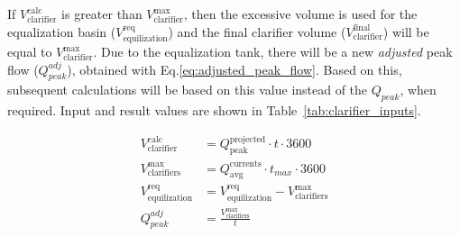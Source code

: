 \documentclass[11pt]{article}
\begin{document}
If $V_{\text{clarifier}}^{\text{calc}}$  is greater than $V_{\text{clarifier}}^{\text{max}}$, then the excessive volume 
is used for the equalization basin ($V_{\text{equilization}}^{\text{req}}$) and the final clarifier 
volume ($V_{\text{clarifier}}^{\text{final}}$) will be equal to 
$V_{\text{clarifier}}^{\text{max}}$. Due to the equalization tank, there will 
be a new \textit{adjusted} peak flow ($Q_{peak}^{adj}$), obtained with Eq.\eqref{eq:adjusted_peak_flow}. Based on this, subsequent calculations will 
be based on this value instead of the $Q_{peak}$, when required. Input and result values are
shown in Table~\ref{tab:clarifier_inputs}.


\begin{align}
V_{\text{clarifier}}^{\text{calc}} &= Q_{\text{peak}}^{\text{projected}} \cdot t \cdot 3600 \label{eq:clarifier_volume}\\
V_{\text{clarifiers}}^{\text{max}} &= Q_{\text{avg}}^{\text{currents}} \cdot t_{max} \cdot 3600 \label{eq:clarifier_max_volume}\\
V_{\text{equilization}}^{\text{req}} &=V_{\text{equilization}}^{\text{req}}-V_{\text{clarifiers}}^{\text{max}} \label{eq:required_equilization_volume}\\
Q_{peak}^{adj} &= \frac{V_{\text{clarifiers}}^{\text{max}}}{t} \label{eq:adjusted_peak_flow}
\end{align}
\end{document}
